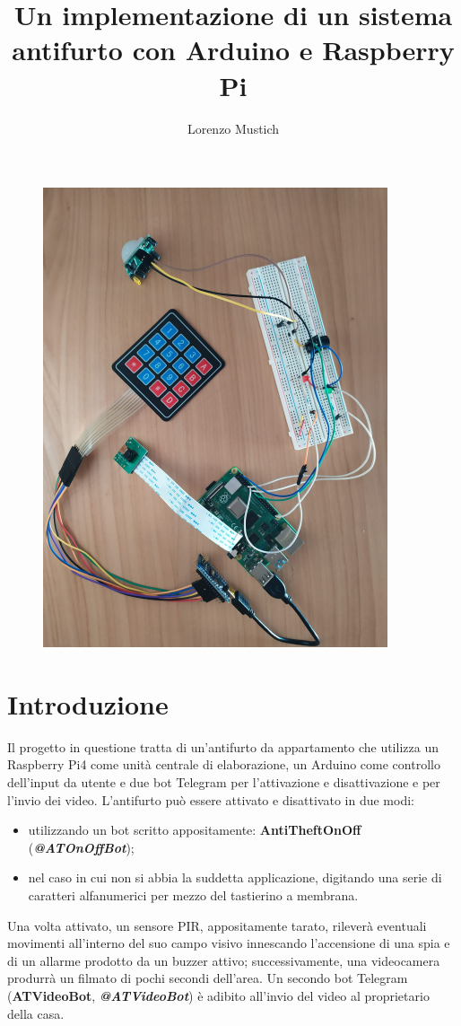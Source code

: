 \documentclass[12pt]{article}
\title{Un implementazione di un sistema antifurto con Arduino e Raspberry Pi}
\author{Lorenzo Mustich}
\begin{document}
	\maketitle
	
	\vfill
	\begin{figure}[h]
		\centering
		\includegraphics[width=4.0in]{prototipo}
	\end{figure}
	\vfill


	\newpage
	\tableofcontents
	\newpage

	\section{Introduzione}
	Il progetto in questione tratta di un'antifurto da appartamento che utilizza un Raspberry Pi4 
	come unità centrale di elaborazione, un Arduino come controllo dell'input da utente e due bot 
	Telegram per l'attivazione e disattivazione e per l'invio dei video. 
	L'antifurto può essere attivato e disattivato in due modi: 
	\begin{itemize}
		\item utilizzando un bot scritto appositamente: \textbf{AntiTheftOnOff} 
		(\textbf{\textit{@ATOnOffBot}});
		\item nel caso in cui non si abbia la suddetta applicazione, digitando una serie di caratteri 
		alfanumerici per mezzo del tastierino a membrana.
	\end{itemize}
	Una volta attivato, un sensore PIR, appositamente tarato, rileverà eventuali movimenti 
	all'interno del suo campo visivo innescando l'accensione di una spia e di un allarme prodotto 
	da un buzzer attivo; successivamente, una videocamera produrrà un filmato di pochi secondi 
	dell'area. Un secondo bot Telegram (\textbf{ATVideoBot}, \textbf{\textit{@ATVideoBot}}) 
	è adibito all'invio del video al proprietario della casa. 
	\clearpage
\end{document}
